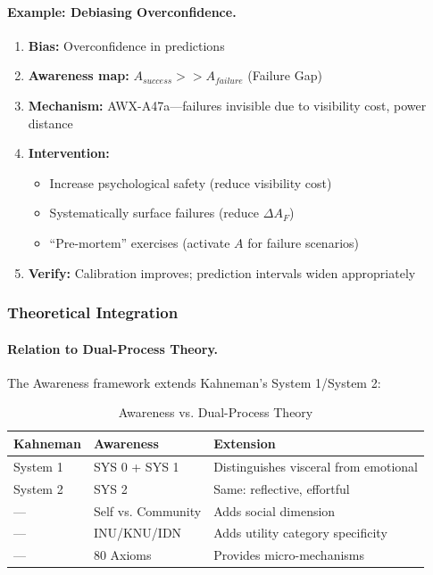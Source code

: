 \paragraph{Example: Debiasing Overconfidence.}
\begin{enumerate}
\item \textbf{Bias:} Overconfidence in predictions
\item \textbf{Awareness map:} $A_{success} >> A_{failure}$ (Failure Gap)
\item \textbf{Mechanism:} AWX-A47a---failures invisible due to visibility cost, power distance
\item \textbf{Intervention:} 
\begin{itemize}
\item Increase psychological safety (reduce visibility cost)
\item Systematically surface failures (reduce $\Delta A_F$)
\item ``Pre-mortem'' exercises (activate $A$ for failure scenarios)
\end{itemize}
\item \textbf{Verify:} Calibration improves; prediction intervals widen appropriately
\end{enumerate}

\subsubsection{Theoretical Integration}

\paragraph{Relation to Dual-Process Theory.}
The Awareness framework extends Kahneman's System 1/System 2:

\begin{table}[htbp]
\centering
\caption{Awareness vs. Dual-Process Theory}
\label{tab:dual-process-comparison}
\renewcommand{\arraystretch}{1.3}
\begin{tabular}{@{}lll@{}}
\toprule
\textbf{Kahneman} & \textbf{Awareness} & \textbf{Extension} \\
\midrule
System 1 & SYS 0 + SYS 1 & Distinguishes visceral from emotional \\
System 2 & SYS 2 & Same: reflective, effortful \\
--- & Self vs. Community & Adds social dimension \\
--- & INU/KNU/IDN & Adds utility category specificity \\
--- & 80 Axioms & Provides micro-mechanisms \\
\bottomrule
\end{tabular}
\end{table}

